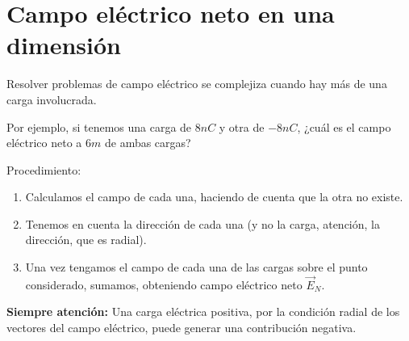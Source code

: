 \section{Campo eléctrico neto en una dimensión}

Resolver problemas de campo eléctrico se complejiza cuando hay más de una carga involucrada.

Por ejemplo, si tenemos una carga de \(8nC\) y otra de \(-8nC\),
¿cuál es el campo eléctrico neto a \(6m\) de ambas cargas?

Procedimiento:
\begin{enumerate}
    \item Calculamos el campo de cada una,
    haciendo de cuenta que la otra no existe.
    \item Tenemos en cuenta la dirección de cada una
    (y no la carga, atención, la dirección, que es radial).
    \item Una vez tengamos el campo de cada una de las cargas sobre el punto considerado,
    sumamos,
    obteniendo campo eléctrico neto \(\vec{E}_N\).
\end{enumerate}

\textbf{Siempre atención: }
Una carga eléctrica positiva,
por la condición radial de los vectores del campo eléctrico,
puede generar una contribución negativa.
